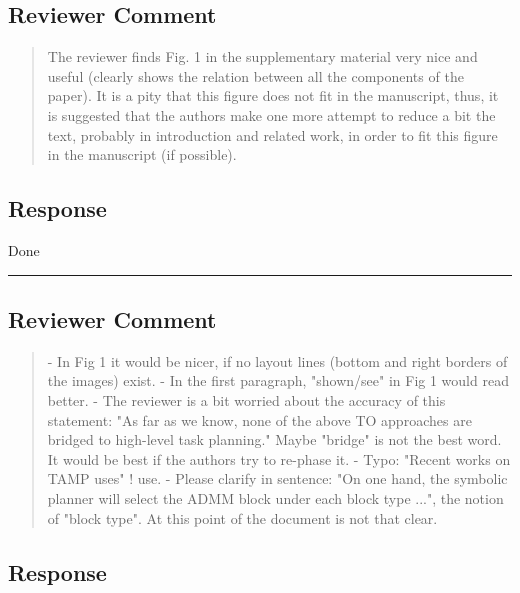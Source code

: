 \subsection{Reviewer Comment}
\begin{mdframed}
\begin{quote}
The reviewer finds Fig. 1 in the supplementary material very nice and useful (clearly shows the relation
between all the components of the paper). It is a pity that this figure does not fit in the manuscript, thus, it
is suggested that the authors make one more attempt to reduce a bit the text, probably in introduction and
related work, in order to fit this figure in the manuscript (if possible).
\end{quote}
\end{mdframed}

\subsection{Response} 
Done

\noindent\rule{17cm}{2.0pt}

\subsection{Reviewer Comment}
\begin{mdframed}
\begin{quote}
- In Fig 1 it would be nicer, if no layout lines (bottom and right borders of the images) exist.
- In the first paragraph, "shown/see" in Fig 1 would read better.
- The reviewer is a bit worried about the accuracy of this statement: "As far as we know, none of the
above TO approaches are bridged to high-level task planning." Maybe "bridge" is not the best word. It
would be best if the authors try to re-phase it.
- Typo: "Recent works on TAMP uses" ! use.
- Please clarify in sentence: "On one hand, the symbolic planner will select the ADMM block under each
block type ...", the notion of "block type". At this point of the document is not that clear.
\end{quote}
\end{mdframed}

\subsection{Response} 

